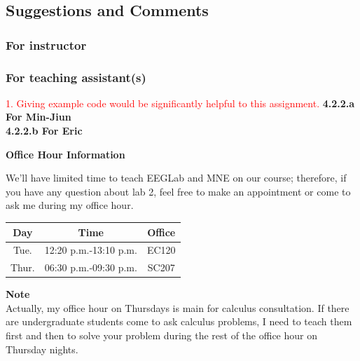 \documentclass[a4 paper]{article}
\begin{document}
\subsection{Suggestions and Comments}
\subsubsection{For instructor}
\subsubsection{For teaching assistant(s)}
\textcolor{red}{1. Giving example code would be significantly helpful to this assignment.\newline
}
\textbf{4.2.2.a For Min-Jiun}\\
\textbf{4.2.2.b For Eric}\\
\noindent{\color{LightRubineRed} \rule{\linewidth}{0.5mm}}
\begin{center}
    \large{\textbf{Office Hour Information}}
\end{center}
\par We'll have limited time to teach EEGLab and MNE on our course; therefore, if you have any question about lab 2, feel free to make an appointment or come to ask me during my office hour.\\
\begin{center}
    \begin{tabular}{||c|c|c||}
    \hline
    Day & Time & Office\\
        \hline\hline
          Tue. & 12:20 p.m.-13:10 p.m. & EC120 \\
          \hline
          Thur. & 06:30 p.m.-09:30 p.m. & SC207\\
          \hline
    \end{tabular}
\end{center}
\textbf{Note}\\
Actually, my office hour on Thursdays is main for calculus consultation. If there are undergraduate students come to ask calculus problems, I need to teach them first and then to solve your problem during the rest of the office hour on Thursday nights.\\
\noindent{\color{LightRubineRed} \rule{\linewidth}{0.5mm}}
\end{document}
